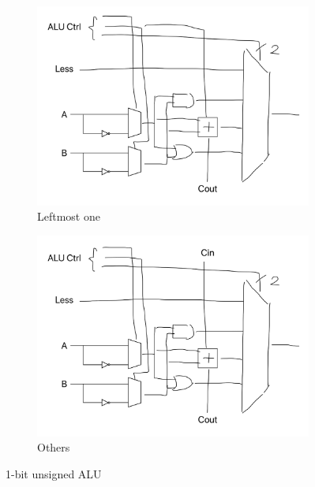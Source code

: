 \documentclass[12pt, a4paper]{article}
\begin{document}
\begin{figure}[htbp]
\centering
\begin{subfigure}{.45\linewidth}
\includegraphics[width=\linewidth]{Unsigned ALU 0}
\caption{Leftmost one}
\end{subfigure}
\begin{subfigure}{.45\linewidth}
\includegraphics[width=\linewidth]{Unsigned ALU}
\caption{Others}
\end{subfigure}
\caption{1-bit unsigned ALU}
\label{fig:alu}
\end{figure}
\end{document}
